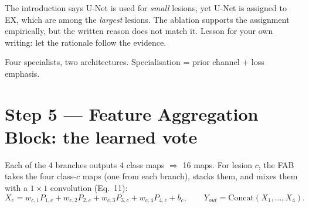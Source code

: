 \documentclass[11pt,a4paper]{article}
\begin{document}
\begin{careful}
The introduction says U-Net is used for \emph{small} lesions, yet U-Net is assigned to EX, which are
among the \emph{largest} lesions. The ablation supports the assignment empirically, but the written
reason does not match it. Lesson for your own writing: let the rationale follow the evidence.
\end{careful}

\begin{recap}
Four specialists, two architectures. Specialisation = prior channel + loss emphasis.
\end{recap}

\section{Step 5 --- Feature Aggregation Block: the learned vote}
\begin{idea}
Each of the 4 branches outputs 4 class maps $\Rightarrow$ 16 maps. For lesion $c$, the FAB takes the
four class-$c$ maps (one from each branch), stacks them, and mixes them with a
$1\times1$ convolution (Eq.~11):
\[
X_{c} = w_{c,1}P_{1,c} + w_{c,2}P_{2,c} + w_{c,3}P_{3,c} + w_{c,4}P_{4,c} + b_c ,\qquad
Y_{out}=\mathrm{Concat}(X_1,\dots,X_4).
\]
\end{idea}

\begin{center}
\end{center}
\end{document}
